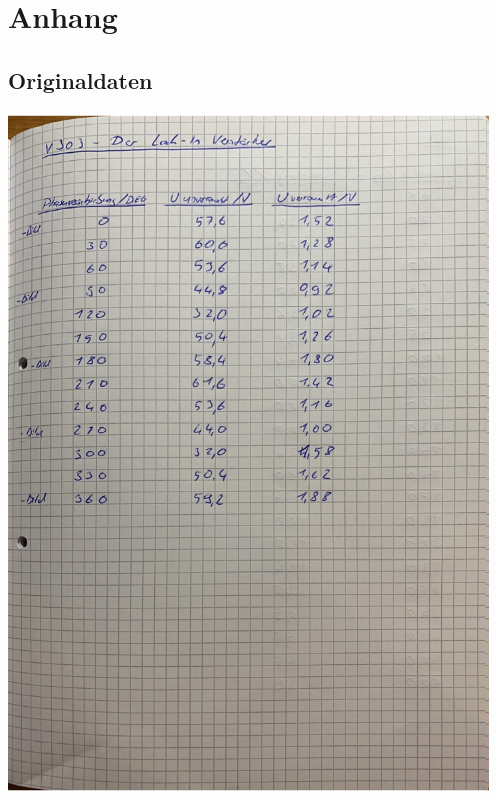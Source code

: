 \section{Anhang}
\label{sec:Anhang}
\subsection{Originaldaten}
\includegraphics[height=18cm]{content/Bilder/Originaldaten.pdf}
\newpage
